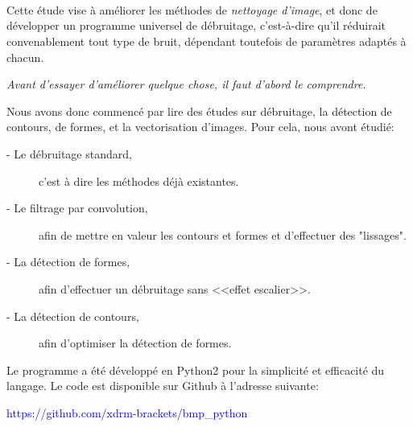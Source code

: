 \documentclass{article}
\begin{document}
			\\
			\\
			
			
			\hrulefill\\
		
			Cette étude vise à améliorer les méthodes de \emph{nettoyage d'image}, et donc de développer un programme universel de débruitage, c'est-à-dire qu'il réduirait convenablement tout type de bruit, dépendant toutefois de paramètres adaptés à chacun.
			\begin{center} \emph{Avant d'essayer d'améliorer quelque chose, il faut d'abord le comprendre.} \end{center}
			Nous avons donc commencé par lire des études sur débruitage, la détection de contours, de formes, et la vectorisation d'images.
			\noindent Pour cela, nous avont étudié:
			\begin{description}
				\item[ - Le débruitage standard,]c'est à dire les méthodes déjà existantes.
				\item[ - Le filtrage par convolution,]afin de mettre en valeur les contours et formes et d'effectuer des "lissages".
				\item[ - La détection de formes,]afin d'effectuer un débruitage sans <<effet escalier>>.
				\item[ - La détection de contours,]afin d'optimiser la détection de formes.
			\end{description}
			Le programme a été développé en Python2 pour la simplicité et efficacité du langage. Le code est disponible sur Github à l'adresse suivante:
			\begin{center} \textcolor{blue}{https://github.com/xdrm-brackets/bmp\_python} \end{center}
\end{document}
